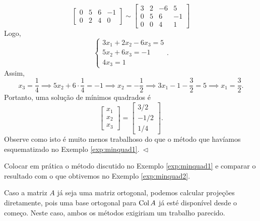 \documentclass[../livro.tex]{subfiles}  %
\begin{document}
\begin{example}
\begin{equation}
\begin{bmatrix}
    0 & 5 &  6 & -1 \\
    0 & 2 &  4 & 0
  \end{bmatrix} \sim
  \begin{bmatrix}
    3 & 2 & -6 & 5 \\
    0 & 5 &  6 & -1 \\
    0 & 0 &  4 & 1
  \end{bmatrix}
  \end{equation} Logo,
  \begin{equation}
  \left\{
    \begin{array}{ll}
      3 x_1 + 2 x_2 - 6 x_3 = 5 \\
      5x_2 + 6 x_3 = -1 \\
      4x_3 = 1
    \end{array}
  \right..
  \end{equation} Assim,
  \begin{equation}
  x_3 = \frac{1}{4} \implies 5x_2 + 6 \cdot \frac{1}{4} = -1 \implies x_2 = -\frac{1}{2} \implies 3 x_1 - 1 - \frac{3}{2}  = 5 \implies x_1 = \frac{3}{2}.
  \end{equation} Portanto, uma solução de mínimos quadrados é
  \begin{equation}
  \begin{bmatrix}
    x_1 \\ x_2 \\ x_3
  \end{bmatrix} =
  \begin{bmatrix}
    3/2 \\ -1/2 \\ 1/4
  \end{bmatrix}.
  \end{equation} Observe como isto é muito menos trabalhoso do que o método que havíamos esquematizado no Exemplo \ref{exp:minquad1}$. \ \lhd$
\end{example}

\begin{exercise}
  Colocar em prática o método discutido no Exemplo \ref{exp:minquad1} e comparar o resultado com o que obtivemos no Exemplo \ref{exp:minquad2}.
\end{exercise}

\begin{remark}
  Caso a matriz $A$ já seja uma matriz ortogonal, podemos calcular projeções diretamente, pois uma base ortogonal para $\operatorname{Col} A$ já esté disponível desde o começo. Neste caso, ambos os métodos exigiriam um trabalho parecido.
\end{remark}
\end{document}
